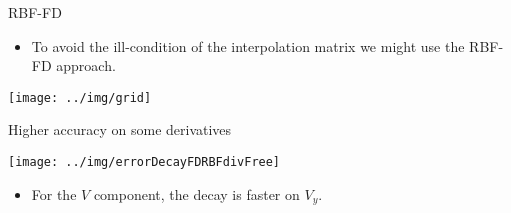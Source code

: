 \documentclass{beamer}
\begin{document}
\begin{frame}{RBF-FD}
  \begin{itemize}
    \item To avoid the ill-condition of the interpolation matrix we might use
      the RBF-FD approach.
  \end{itemize}
  \begin{center}
    \texttt{[image: ../img/grid]}
  \end{center}
\end{frame}

\begin{frame}{Higher accuracy on some derivatives}
  \begin{center}
    \texttt{[image: ../img/errorDecayFDRBFdivFree]}
  \end{center}
  
  \begin{itemize}
    \item For the $V$ component, the decay is faster on $V_y$.
  \end{itemize}
\end{frame}
\end{document}
